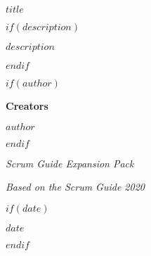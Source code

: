 \begin{titlepage}
  \centering
  
  \vspace*{2cm}
  {\Huge\bfseries $title$ \par}
  \vspace{1cm}
  
  $if(description)$
  {\large $description$ \par}
  \vspace{1.5cm}
  $endif$
  
  $if(author)$
  \vspace{1cm}
  {\Large\textbf{Creators} \par}
  \vspace{0.5cm}
  
  \begin{center}
  {\large $author$ \par}
  \end{center}
  $endif$
  
  \vfill
  
  {\small\textit{Scrum Guide Expansion Pack} \par}
  {\small\textit{Based on the Scrum Guide 2020} \par}
  
  $if(date)$
  \vspace{0.5cm}
  {\large $date$ \par}
  $endif$
  
\end{titlepage}
\clearpage
